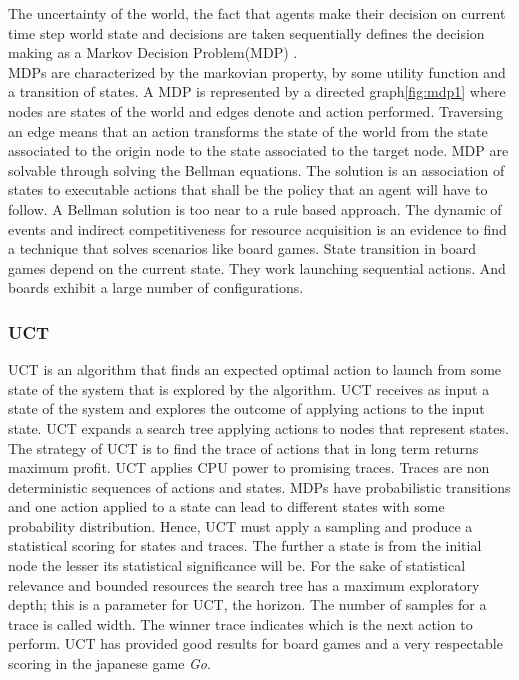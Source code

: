 \documentclass[11pt,oneside,a4paper,openright]{report}
\begin{document}
The uncertainty of the world, the fact that agents make their decision on current time step
world state and decisions are taken sequentially defines the decision making as a Markov Decision Problem(MDP)
\cite[chapter.17]{RussellNorvig}.\\
MDPs are characterized by the markovian property, by some utility function and a transition of states. A MDP is represented by a directed graph\ref{fig:mdp1} where nodes are states of the world and edges denote
and action performed. Traversing an edge means that an action transforms the state of the world from the state associated to the origin node to the state associated to the target node. MDP are solvable through solving the Bellman equations. The solution is an association of states to executable actions that shall be the policy that an agent will have to follow. A Bellman solution is too near to a rule based approach. The dynamic of events and indirect competitiveness for resource acquisition is an evidence to find a technique that solves scenarios like board games. State transition in board games depend on the current state. They work launching sequential actions. And boards exhibit a large number of configurations. 

\subsubsection{UCT} 
\label{sec:UCT}

UCT \cite{BallaFern2009} \cite{BonetGeffner2012} is an algorithm that finds an expected optimal action to launch from some state of the system that is explored by the algorithm. UCT receives as input a state of the system and explores the outcome of applying actions to the input state. UCT expands a search tree applying actions to nodes
that represent states. The strategy of UCT is to find the trace of actions that in long term returns maximum profit.
UCT applies CPU power to promising traces. Traces are non deterministic sequences of actions and states. MDPs have probabilistic transitions and one action applied to a state can lead to different states with some probability distribution. Hence, UCT must apply a sampling and produce a statistical scoring for states and traces. The further a state is from the initial node the lesser its statistical significance will be. For the sake of statistical relevance and bounded resources the search tree has a maximum exploratory depth; this is a parameter for UCT, the horizon.
The number of samples for a trace is called width. The winner trace indicates which is the next action to perform. UCT has provided good results for board games and a very respectable scoring in the japanese game \emph{Go}\cite{uctGO}. 
\end{document}
